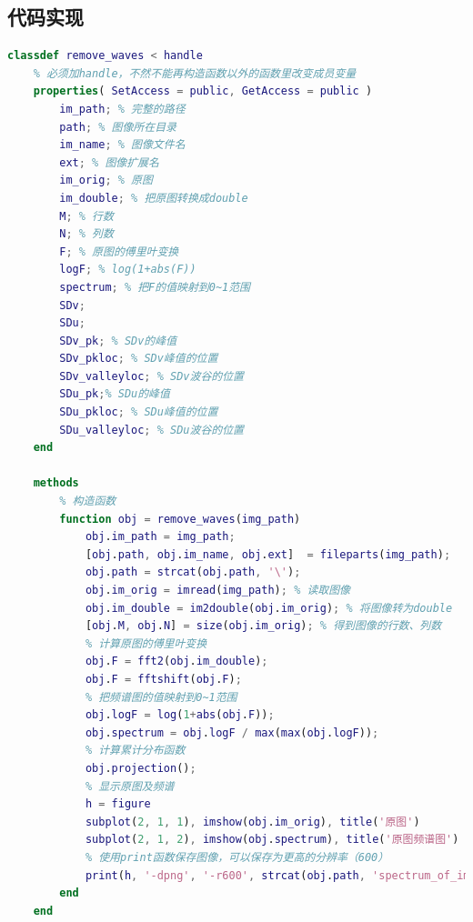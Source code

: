 \documentclass[UTF8]{ctexart}
\begin{document}
         
        \subsection{代码实现}
           
             \begin{lstlisting}[language=Matlab,caption={$remove\_waves$类},label={broadcast.cpp}]
classdef remove_waves < handle
    % 必须加handle，不然不能再构造函数以外的函数里改变成员变量
    properties( SetAccess = public, GetAccess = public )
        im_path; % 完整的路径
        path; % 图像所在目录
        im_name; % 图像文件名
        ext; % 图像扩展名
        im_orig; % 原图
        im_double; % 把原图转换成double
        M; % 行数
        N; % 列数
        F; % 原图的傅里叶变换
        logF; % log(1+abs(F))
        spectrum; % 把F的值映射到0~1范围
        SDv;
        SDu;
        SDv_pk; % SDv的峰值
        SDv_pkloc; % SDv峰值的位置
        SDv_valleyloc; % SDv波谷的位置
        SDu_pk;% SDu的峰值
        SDu_pkloc; % SDu峰值的位置
        SDu_valleyloc; % SDu波谷的位置
    end
    
    methods
        % 构造函数
        function obj = remove_waves(img_path)
            obj.im_path = img_path;
            [obj.path, obj.im_name, obj.ext]  = fileparts(img_path);
            obj.path = strcat(obj.path, '\');
            obj.im_orig = imread(img_path); % 读取图像
            obj.im_double = im2double(obj.im_orig); % 将图像转为double
            [obj.M, obj.N] = size(obj.im_orig); % 得到图像的行数、列数
            % 计算原图的傅里叶变换
            obj.F = fft2(obj.im_double);
            obj.F = fftshift(obj.F);
            % 把频谱图的值映射到0~1范围
            obj.logF = log(1+abs(obj.F));
            obj.spectrum = obj.logF / max(max(obj.logF));
            % 计算累计分布函数
            obj.projection();
            % 显示原图及频谱
            h = figure
            subplot(2, 1, 1), imshow(obj.im_orig), title('原图')
            subplot(2, 1, 2), imshow(obj.spectrum), title('原图频谱图')
            % 使用print函数保存图像，可以保存为更高的分辨率（600）
            print(h, '-dpng', '-r600', strcat(obj.path, 'spectrum_of_img.png'))
        end     
    end
    
    
    

\end{lstlisting}
\end{document}
